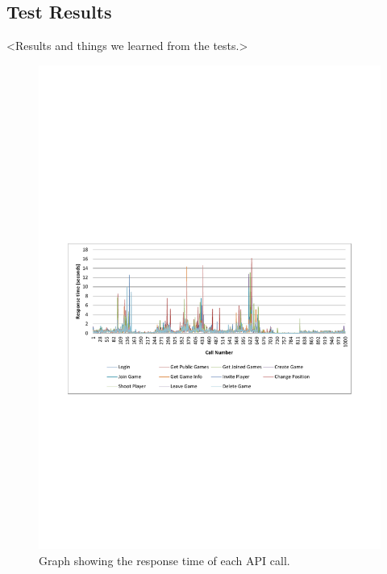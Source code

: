 \subsection{Test Results}
<Results and things we learned from the tests.>

\begin{figure}[H]
  \centering
  \includegraphics[width=\textwidth, clip=true, trim=0 22em 0 22em]{billeder/loadgraph.pdf}  
  \caption{Graph showing the response time of each API call.}
  \label{fig:loadgraph}
\end{figure}

